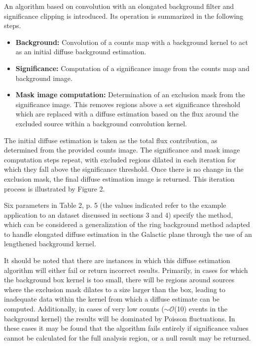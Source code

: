 \documentclass{PoS}
\begin{document}
An algorithm based on convolution with an elongated background filter and significance clipping is introduced. Its operation is summarized in the following steps.

\begin{itemize}[noitemsep,nolistsep]
\item \textbf{Background:} Convolution of a counts map with a background kernel to act as an initial diffuse background estimation.
\item \textbf{Significance:} Computation of a significance image from the counts map and background image.
\item \textbf{Mask image computation:} Determination of an exclusion mask from the significance image. This removes regions above a set significance threshold which are replaced with a diffuse estimation based on the flux around the excluded source within a background convolution kernel.
\end{itemize}

The initial diffuse estimation is taken as the total flux contribution, as determined from the provided counts image. The significance and mask image computation steps repeat, with excluded regions dilated in each iteration for which they fall above the significance threshold. Once there is no change in the exclusion mask, the final diffuse estimation image is returned. This iteration process is illustrated by Figure 2.

Six parameters in Table 2, p. 5 (the values indicated refer to the example application to an dataset discussed in sections 3 and 4) specify the method, which can be considered a generalization of the ring background method \cite{berge} adapted to handle elongated diffuse estimation in the Galactic plane through the use of an lengthened background kernel.

It should be noted that there are instances in which this diffuse estimation algorithm will either fail or return incorrect results. Primarily, in cases for which the background box kernel is too small, there will be regions around sources where the exclusion mask dilates to a size larger than the box, leading to inadequate data within the kernel from which a diffuse estimate can be computed. Additionally, in cases of very low counts (\textbf{$\sim\mathcal{O}$}(10) events in the background kernel) the results will be dominated by Poisson fluctuations. In these cases it may be found that the algorithm fails entirely if significance values cannot be calculated for the full analysis region, or a null result may be returned.
\end{document}
